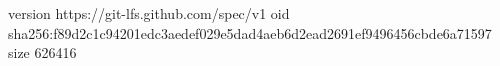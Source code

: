 version https://git-lfs.github.com/spec/v1
oid sha256:f89d2c1c94201edc3aedef029e5dad4aeb6d2ead2691ef9496456cbde6a71597
size 626416
